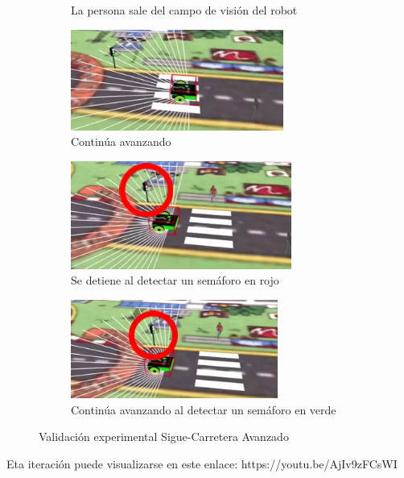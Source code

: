 \documentclass{report}
\begin{document}
\begin{figure}[h]
\begin{subfigure}{.5\textwidth}
  \caption{La persona sale del campo de visión del robot}
  \label{fig:sub-fourth}
\end{subfigure}
\begin{subfigure}{.5\textwidth}
  \centering
  \includegraphics[width=.7\linewidth]{images/cap4/5-1.png}  
  \caption{Continúa avanzando}
  \label{fig:sub-first}
\end{subfigure}
\begin{subfigure}{.5\textwidth}
  \centering
  \includegraphics[width=.7\linewidth]{images/cap4/6-1.png}  
  \caption{Se detiene al detectar un semáforo en rojo}
  \label{fig:sub-second}
\end{subfigure}
\begin{subfigure}{.5\textwidth}
  \centering
  \includegraphics[width=.7\linewidth]{images/cap4/7-1.png}  
  \caption{Continúa avanzando al detectar un semáforo en verde}
  \label{fig:sub-third}
\end{subfigure}
\caption{Validación experimental Sigue-Carretera Avanzado}
\label{fig:fig}
\end{figure}

Eta iteración puede visualizarse en este enlace: https://youtu.be/AjIv9zFCsWI
\end{document}

